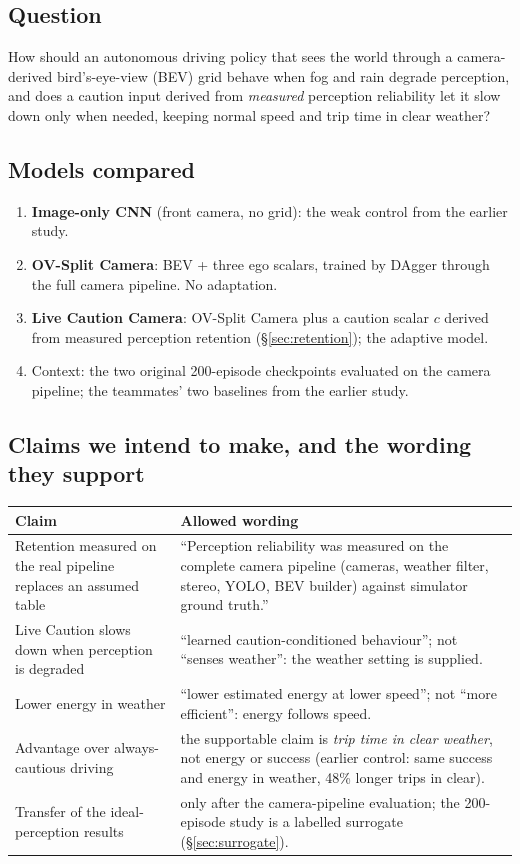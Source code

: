 \documentclass[11pt,a4paper]{article}
\begin{document}
\subsection{Question}
How should an autonomous driving policy that sees the world through a camera-derived bird's-eye-view (BEV) grid behave when fog and rain degrade perception, and does a caution input derived from \emph{measured} perception reliability let it slow down only when needed, keeping normal speed and trip time in clear weather?

\subsection{Models compared}
\begin{enumerate}[leftmargin=*]
\item \textbf{Image-only CNN} (front camera, no grid): the weak control from the earlier study.
\item \textbf{OV-Split Camera}: BEV + three ego scalars, trained by DAgger through the full camera pipeline. No adaptation.
\item \textbf{Live Caution Camera}: OV-Split Camera plus a caution scalar $c$ derived from measured perception retention (\S\ref{sec:retention}); the adaptive model.
\item Context: the two original 200-episode checkpoints evaluated on the camera pipeline; the teammates' two baselines from the earlier study.
\end{enumerate}

\subsection{Claims we intend to make, and the wording they support}
\begin{center}\small\begin{tabular}{@{}p{5.6cm}p{9.8cm}@{}}\toprule
Claim & Allowed wording\\\midrule
Retention measured on the real pipeline replaces an assumed table & ``Perception reliability was measured on the complete camera pipeline (cameras, weather filter, stereo, YOLO, BEV builder) against simulator ground truth.''\\
Live Caution slows down when perception is degraded & ``learned caution-conditioned behaviour''; not ``senses weather'': the weather setting is supplied.\\
Lower energy in weather & ``lower estimated energy at lower speed''; not ``more efficient'': energy follows speed.\\
Advantage over always-cautious driving & the supportable claim is \emph{trip time in clear weather}, not energy or success (earlier control: same success and energy in weather, 48\% longer trips in clear).\\
Transfer of the ideal-perception results & only after the camera-pipeline evaluation; the 200-episode study is a labelled surrogate (\S\ref{sec:surrogate}).\\\bottomrule\end{tabular}\end{center}
\end{document}
